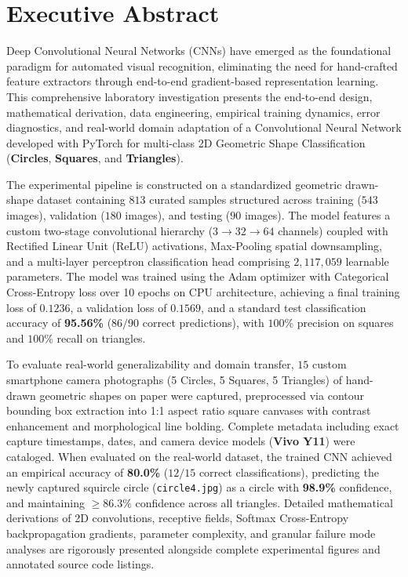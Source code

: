 \documentclass[11pt,a4paper,oneside]{report}
\begin{document}
\chapter*{Executive Abstract}
Deep Convolutional Neural Networks (CNNs) have emerged as the foundational paradigm for automated visual recognition, eliminating the need for hand-crafted feature extractors through end-to-end gradient-based representation learning. This comprehensive laboratory investigation presents the end-to-end design, mathematical derivation, data engineering, empirical training dynamics, error diagnostics, and real-world domain adaptation of a Convolutional Neural Network developed with PyTorch for multi-class 2D Geometric Shape Classification (\textbf{Circles}, \textbf{Squares}, and \textbf{Triangles}).

The experimental pipeline is constructed on a standardized geometric drawn-shape dataset containing $813$ curated samples structured across training ($543$ images), validation ($180$ images), and testing ($90$ images). The model features a custom two-stage convolutional hierarchy ($3 \to 32 \to 64$ channels) coupled with Rectified Linear Unit ($\text{ReLU}$) activations, Max-Pooling spatial downsampling, and a multi-layer perceptron classification head comprising $2,117,059$ learnable parameters. The model was trained using the Adam optimizer with Categorical Cross-Entropy loss over 10 epochs on CPU architecture, achieving a final training loss of $0.1236$, a validation loss of $0.1569$, and a standard test classification accuracy of \textbf{95.56\%} ($86/90$ correct predictions), with $100\%$ precision on squares and $100\%$ recall on triangles.

To evaluate real-world generalizability and domain transfer, $15$ custom smartphone camera photographs (5 Circles, 5 Squares, 5 Triangles) of hand-drawn geometric shapes on paper were captured, preprocessed via contour bounding box extraction into 1:1 aspect ratio square canvases with contrast enhancement and morphological line bolding. Complete metadata including exact capture timestamps, dates, and camera device models (\textbf{Vivo Y11}) were cataloged. When evaluated on the real-world dataset, the trained CNN achieved an empirical accuracy of \textbf{80.0\%} ($12/15$ correct classifications), predicting the newly captured squircle circle (\texttt{circle4.jpg}) as a circle with \textbf{98.9\%} confidence, and maintaining $\ge 86.3\%$ confidence across all triangles. Detailed mathematical derivations of 2D convolutions, receptive fields, Softmax Cross-Entropy backpropagation gradients, parameter complexity, and granular failure mode analyses are rigorously presented alongside complete experimental figures and annotated source code listings.
\end{document}
